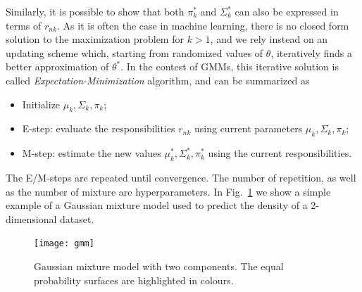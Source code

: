 %
Similarly, it is possible to show that both $\pi_k^{*}$ and $\Sigma_k^{*}$ can also be expressed in terms of $r_{nk}$. 
As it is often the case in machine learning, there is no closed form solution to the maximization problem for $k > 1$, and we rely instead on an updating scheme which, starting from randomized values of $\theta$, iteratively finds a better approximation of $\theta^{*}$.
In the contest of GMMs, this iterative solution is called \textit{Expectation-Minimization} algorithm, and can be summarized as
%
\begin{itemize}
\item
Initialize $\mu_k, \Sigma_k, \pi_k$;
\item
E-step: evaluate the responsibilities $r_{nk}$ using current parameters $\mu_k, \Sigma_k, \pi_k$;
\item
M-step: estimate the new values $\mu_k^{*}, \Sigma_k^{*}, \pi_k^{*}$ using the current responsibilities.
\end{itemize}
The E/M-steps are repeated until convergence. The number of repetition, as well as the number of mixture are hyperparameters.
In Fig.~\ref{fig:gmm} we show a simple example of a Gaussian mixture model used to predict the density of a 2-dimensional dataset.
\begin{figure}[t]
\centering
\texttt{[image: gmm]}
\caption{Gaussian mixture model with two components. The equal probability surfaces are highlighted in colours.}
\label{fig:gmm}
\end{figure}

